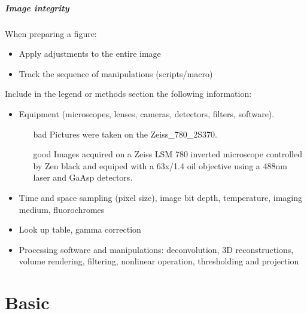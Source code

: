 \documentclass[ignorenonframetext,aspectratio=169,10pt,xcolor=table]{beamer}
\begin{document}
\begin{frame} \frametitle{Image integrity}

  When preparing a figure:

  \begin{itemize}
  \item Apply adjustments to the entire image
  \item Track the sequence of manipulations (scripts/macro)
  \end{itemize}

  Include in the legend or methods section the following
  information:

  \begin{itemize}
  \item Equipment (microscopes, lenses, cameras, detectors,
    filters, software).
     \begin{itemize}\small
     \item[bad] Pictures were taken on the Zeiss\_780\_2S370.
     \item[good] Images acquired on a Zeiss LSM 780 inverted microscope
       controlled by Zen black and equiped with a 63x/1.4 oil objective using a
       488nm laser and GaAsp detectors.
     \end{itemize}
  \item Time and space sampling (pixel size), image bit depth, temperature,
    imaging medium, fluorochromes
  \item Look up table, gamma correction
  \item Processing software and manipulations: deconvolution, 3D
    reconstructions, volume rendering, filtering, nonlinear operation,
    thresholding and projection
  \end{itemize}

   
\end{frame}


\part{Basic}
\frame{\partpage}
\end{document}
